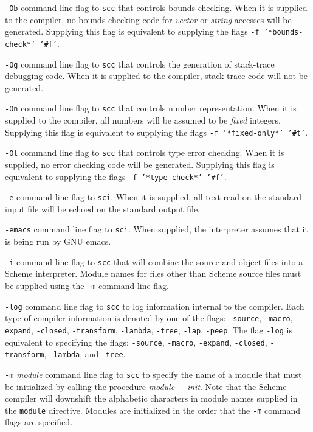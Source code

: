 \documentclass[10pt,twocolumn]{article}
\begin{document}
\texttt{-Ob} command line flag to \texttt{scc} that controls bounds
checking.  When it is supplied to the compiler, no bounds checking
code for \emph{vector} or \emph{string} accesses will be generated.
Supplying this flag is equivalent to supplying the flags \texttt{-f
  '*bounds-check*' '\#f'}.

\texttt{-Og} command line flag to \texttt{scc} that controls the
generation of stack-trace debugging code. When it is supplied to the
compiler, stack-trace code will not be generated.

\texttt{-On} command line flag to \texttt{scc} that controls number
representation. When it is supplied to the compiler, all numbers will
be assumed to be \emph{fixed} integers.  Supplying this flag is
equivalent to supplying the flags \texttt{-f '*fixed-only*' '\#t'}.

\texttt{-Ot} command line flag to \texttt{scc} that controls type
error checking. When it is supplied, no error checking code will be
generated. Supplying this flag is equivalent to supplying the flags
\texttt{-f '*type-check*' '\#f'}.

\texttt{-e} command line flag to \texttt{sci}.  When it is supplied,
all text read on the standard input file will be echoed on the
standard output file.

\texttt{-emacs} command line flag to \texttt{sci}.  When supplied, the
interpreter assumes that it is being run by GNU emacs.

\texttt{-i} command line flag to \texttt{scc} that will combine the
source and object files into a Scheme interpreter.  Module names for
files other than Scheme source files must be supplied using the
\texttt{-m} command line flag.

\texttt{-log} command line flag to \texttt{scc} to log information
internal to the compiler.  Each type of compiler information is
denoted by one of the flags: \texttt{-source}, \texttt{-macro},
\texttt{-expand}, \texttt{-closed}, \texttt{-transform},
\texttt{-lambda}, \texttt{-tree}, \texttt{-lap}, \texttt{-peep}.  The
flag \texttt{-log} is equivalent to specifying the flags:
\texttt{-source}, \texttt{-macro}, \texttt{-expand}, \texttt{-closed},
\texttt{-transform}, \texttt{-lambda}, and \texttt{-tree}.

\texttt{-m} \emph{module} command line flag to \texttt{scc} to specify
the name of a module that must be initialized by calling the procedure
\emph{module\_\_init}.  Note that the Scheme compiler will downshift
the alphabetic characters in module names supplied in the
\texttt{module} directive.  Modules are initialized in the order that
the \texttt{-m} command flags are specified.
\end{document}
